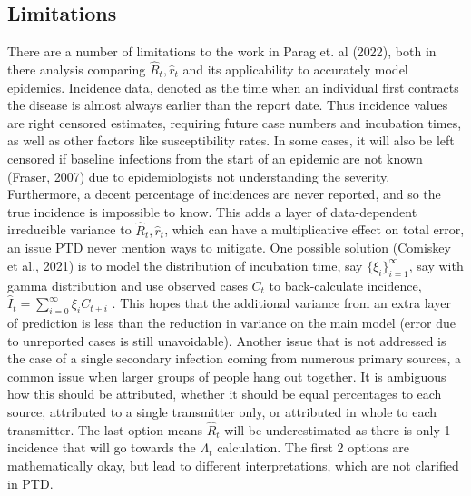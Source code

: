 \documentclass[12pt]{article}
\begin{document}
    \subsection{Limitations}
      There are a number of limitations to the work in Parag et. al (2022), both in there analysis comparing $\hat{R}_t, \hat{r}_t$
      and its applicability to accurately model epidemics. Incidence data, denoted as the time when an individual 
      first contracts the disease is almost always earlier than the report date. Thus 
      incidence values are right censored estimates, requiring future case numbers and incubation times,
      as well as other factors like susceptibility rates. In some cases, it will also be left censored if baseline infections
      from the start of an epidemic are not known (Fraser, 2007) due to epidemiologists not understanding the severity. 
      Furthermore, a decent percentage of incidences are never reported,
      and so the true incidence is impossible to know. This adds a layer of data-dependent irreducible variance to 
      $\hat{R}_t, \hat{r}_t$, which can have a multiplicative effect on total error, an issue PTD never 
      mention ways to mitigate. One possible solution (Comiskey et al., 2021) is to model the distribution of incubation time, 
      say $\{\xi_i\}_{i=1}^\infty$, say with gamma distribution and use observed cases $C_t$ to back-calculate incidence, 
      $\hat{I}_t = \sum_{i=0}^\infty \xi_i C_{t+i}$ . 
      This hopes that the additional variance from an extra layer of prediction is less than the reduction in variance on the main
      model (error due to unreported cases is still unavoidable). Another issue
      that is not addressed is the case of a single secondary infection coming from numerous primary sources, a common issue when
      larger groups of people hang out together. It is ambiguous how this should be attributed, whether it should be equal
      percentages to each source, attributed to a single transmitter only, or attributed in whole to each transmitter. 
      The last option means $\hat{R}_t$ will be underestimated as there is only 1 incidence that will go towards the $\Lambda_t$ 
      calculation. The first 2 options are mathematically okay, but lead to different interpretations, 
      which are not clarified in PTD.
      
\end{document}
